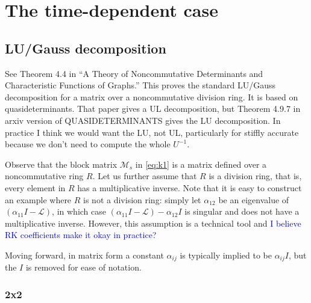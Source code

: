 \documentclass[a4paper,10pt]{article}
\newcommand{\tcb}{\textcolor{blue}}
\begin{document}
\allowdisplaybreaks

\section{The time-dependent case}

\subsection{LU/Gauss decomposition}

See Theorem 4.4 in ``A Theory of Noncommutative Determinants and Characteristic Functions of Graphs.''
This proves the standard LU/Gauss decomposition for a matrix over a noncommutative division ring.
It is based on quasideterminants. That paper gives a UL decomposition, but Theorem 4.9.7 in
arxiv version of QUASIDETERMINANTS gives the LU decomposition. In practice I think we would want
the LU, not UL, particularly for stiffly accurate because we don't need to compute the whole $U^{-1}$. 

Observe that the block matrix $\mathcal{M}_s$ in \eqref{eq:k1} is a matrix defined over a 
noncommutative ring $R$. Let us further assume that $R$ is a division ring, that is, every 
element in $R$ has a multiplicative inverse. Note that it is easy to construct an example
where $R$ is not a division ring: simply let $\alpha_{12}$ be an eigenvalue of $(\alpha_{11}I - \mathcal{L})$,
in which case $(\alpha_{11}I - \mathcal{L}) - \alpha_{12}I$ is singular and does not have
a multiplicative inverse. However, this assumption is a technical tool and \tcb{I believe
RK coefficients make it okay in practice?}

Moving forward, in matrix form a constant $\alpha_{ij}$ is typically implied to be
$\alpha_{ij}I$, but the $I$ is removed for ease of notation.


\subsubsection{2x2}
\end{document}

